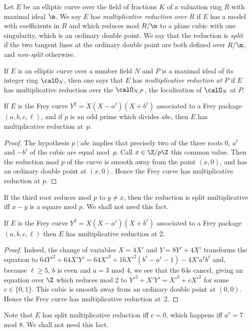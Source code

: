 \begin{definition}\label{EllipticCurve.MultiplicativeReduction} Let $E$ be an elliptic curve over the field of fractions $K$ of a valuation ring $R$ with maximal ideal $\m$. We say $E$ has \emph{multiplicative reduction over $R$} if $E$ has a model with coefficients in $R$ and which reduces mod $R/\m$ to a plane cubic with one singularity, which is an ordinary double point.
  We say that the reduction is \emph{split} if the two tangent lines at the ordinary double point
  are both defined over $R/\m$, and \emph{non-split} otherwise.
\end{definition}

  If $E$ is an elliptic curve 
  over a number field $N$ and $P$ is a maximal ideal of its integer ring $\calO_N$, then one says that $E$ has \emph{multiplicative reduction at $P$} if $E$ has multiplicative reduction over the $\calO_{N,P}$, the localisation of $\calO_N$ at $P$.

\begin{lemma}\label{Frey_curve_mult_reduction} If $E$ is the Frey curve $Y^2=X(X-a^\ell)(X+b^\ell)$ associated to a Frey
  package $(a,b,c,\ell)$, and if $p$ is an odd prime
  which divides $abc$, then $E$ has multiplicative reduction at~$p$.
\end{lemma}
\begin{proof} The hypothesis $p\mid abc$ implies that precisely two of the three roots $0$, $a^\ell$ and $-b^\ell$
  of the cubic are equal mod~$p$. Call $x\in\Z/p\Z$ this common value. Then the reduction mod $p$ of 
  the curve is smooth away from the point $(x,0)$,
  and has an ordinary double point at $(x,0)$. Hence the Frey curve has
  multiplicative reduction at $p$.
\end{proof}
\begin{remark} If the third root reduces mod $p$ to $y\not=x$, then the reduction
  is split multiplicative iff $x-y$ is a square mod $p$. We shall not need this fact.
\end{remark}

\begin{lemma}\label{Frey_curve_mult_reduction_at_two}  If $E$ is the Frey curve $Y^2=X(X-a^\ell)(X+b^\ell)$ associated to a Frey package
  $(a,b,c,\ell)$ then $E$ has multiplicative reduction at 2. 
\end{lemma}
\begin{proof} Indeed, the change of variables $X=4X'$ 
  and $Y=8Y'+4X'$ transforms the equation to 
  $64Y'^2+64X'Y'=64X'^3+16X'^2(b^\ell-a^\ell-1)-4X'a^\ell b^\ell$ and, because $\ell\geq5$,
  $b$ is even and $a=3$ mod 4, we see that the 64s cancel, giving an equation over $\Z$ which reduces mod 2 to
  $Y'^2+X'Y'=X'^3+cX'^2$ for some $c\in\{0,1\}$. This cubic is smooth away from an ordinary 
  double point at $(0,0)$. Hence the Frey curve has multiplicative reduction at~2.
\end{proof}
\begin{remark} Note that $E$ has split multiplicative reduction iff $c=0$, which happens iff $a^\ell=7$ mod $8$. We shall not need this fact.
\end{remark}

